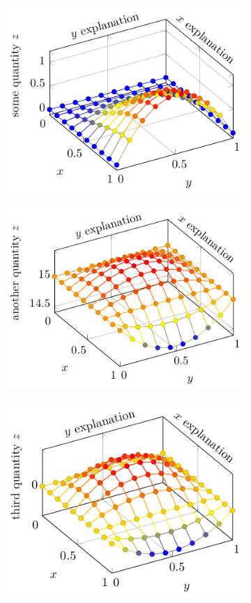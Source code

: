 \documentclass{scrbook}
\begin{document}
	\begin{figure}
		\begin{subfigure}{0.5\linewidth}
			\includegraphics{3dplot_a.pdf}
		\end{subfigure}
		\begin{subfigure}{0.5\linewidth}
			\includegraphics{3dplot_b.pdf}
		\end{subfigure}
		\begin{subfigure}{0.5\linewidth}
			\includegraphics{3dplot_c.pdf}

\end{subfigure}
\end{figure}
\end{document}
